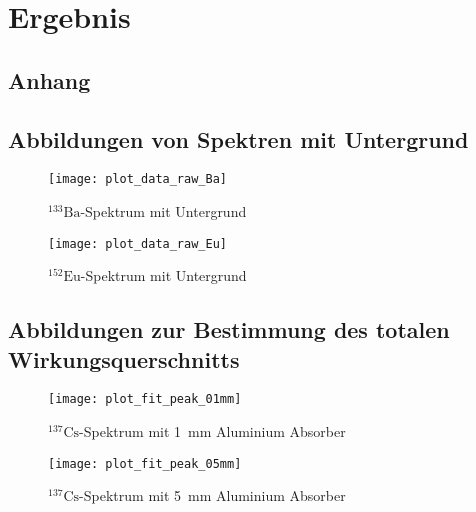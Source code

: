 \documentclass[11pt, ngerman, fleqn, DIV=15, headinclude, BCOR=2cm]{scrreprt}
\begin{document}

\chapter{Ergebnis}




\begin{appendix}

\chapter{Anhang}

\section{Abbildungen von Spektren mit Untergrund}\label{anhang-rohspektren-energiekalibrierung}
\begin{figure}[h]
    \centering
    \texttt{[image: plot\_data\_raw\_Ba]}
    \caption{%
	    $^{133}\text{Ba}$-Spektrum mit Untergrund
    }
    \label{fig:plot_data_raw_Ba}
\end{figure}

\begin{figure}[h]
    \centering
    \texttt{[image: plot\_data\_raw\_Eu]}
    \caption{%
	    $^{152}\text{Eu}$-Spektrum mit Untergrund
   }
    \label{fig:plot_data_raw_Eu}
\end{figure}

\clearpage

\section{Abbildungen zur Bestimmung des totalen Wirkungsquerschnitts} \label{anhang-wirkungsquerschnitt}
\begin{figure}[h]
    \centering
    \texttt{[image: plot\_fit\_peak\_01mm]}
    \caption{%
	    $^{137}\text{Cs}$-Spektrum mit \SI{1}{\milli\metre} Aluminium
	    Absorber
    }
    \label{fig:plot_fit_peak_01mm}
\end{figure}

\begin{figure}[h]
    \centering
    \texttt{[image: plot\_fit\_peak\_05mm]}
    \caption{%
	    $^{137}\text{Cs}$-Spektrum mit \SI{5}{\milli\metre} Aluminium
	    Absorber
   }
    \label{fig:plot_fit_peak_05mm}
\end{figure}


\end{appendix}
\end{document}
